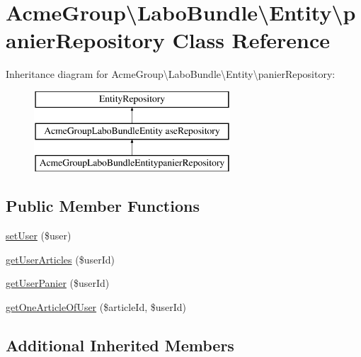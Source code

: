 \hypertarget{class_acme_group_1_1_labo_bundle_1_1_entity_1_1panier_repository}{\section{Acme\+Group\textbackslash{}Labo\+Bundle\textbackslash{}Entity\textbackslash{}panier\+Repository Class Reference}
\label{class_acme_group_1_1_labo_bundle_1_1_entity_1_1panier_repository}
}
Inheritance diagram for Acme\+Group\textbackslash{}Labo\+Bundle\textbackslash{}Entity\textbackslash{}panier\+Repository\+:\begin{figure}[H]
\begin{center}
\leavevmode
\includegraphics[height=3.000000cm]{class_acme_group_1_1_labo_bundle_1_1_entity_1_1panier_repository}
\end{center}
\end{figure}
\subsection*{Public Member Functions}
\begin{DoxyCompactItemize}
\item 
\hyperlink{class_acme_group_1_1_labo_bundle_1_1_entity_1_1panier_repository_ab8f360eee5df76470ab0153a236744fa}{set\+User} (\$user)
\item 
\hyperlink{class_acme_group_1_1_labo_bundle_1_1_entity_1_1panier_repository_a74e6b564133d266a5f4798fa08066248}{get\+User\+Articles} (\$user\+Id)
\item 
\hyperlink{class_acme_group_1_1_labo_bundle_1_1_entity_1_1panier_repository_a144566078fa6bb3cc73623e20712c273}{get\+User\+Panier} (\$user\+Id)
\item 
\hyperlink{class_acme_group_1_1_labo_bundle_1_1_entity_1_1panier_repository_a69c759a7394c38fa16df768dc39ddb24}{get\+One\+Article\+Of\+User} (\$article\+Id, \$user\+Id)
\end{DoxyCompactItemize}
\subsection*{Additional Inherited Members}


